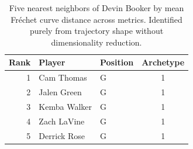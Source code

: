 \begin{table}[htbp]
  \centering\small
  \begin{tabular}{rllc}
    \toprule
    Rank & Player & Position & Archetype \\
    \midrule
    1 & Cam Thomas & G & 1 \\
    2 & Jalen Green & G & 1 \\
    3 & Kemba Walker & G & 1 \\
    4 & Zach LaVine & G & 1 \\
    5 & Derrick Rose & G & 1 \\
    \bottomrule
  \end{tabular}
  \caption{Five nearest neighbors of Devin Booker by mean Fr\'{e}chet curve distance across metrics. Identified purely from trajectory shape without dimensionality reduction.}
  \label{tab:Devin_Booker_frechet_curve_neighbors}
\end{table}


